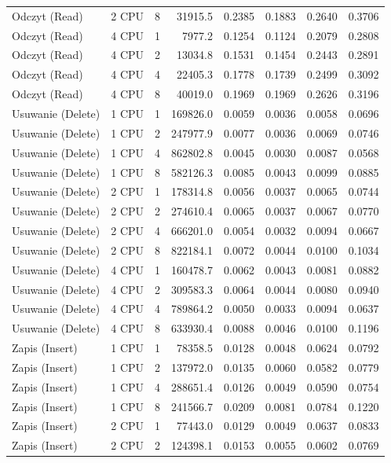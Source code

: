 \begin{table}[ht]
{\begin{tabular}{llcrrrrr}
Odczyt (Read) & 2 CPU & 8 & 31915.5 & 0.2385 & 0.1883 & 0.2640 & 0.3706 \\
Odczyt (Read) & 4 CPU & 1 & 7977.2 & 0.1254 & 0.1124 & 0.2079 & 0.2808 \\
Odczyt (Read) & 4 CPU & 2 & 13034.8 & 0.1531 & 0.1454 & 0.2443 & 0.2891 \\
Odczyt (Read) & 4 CPU & 4 & 22405.3 & 0.1778 & 0.1739 & 0.2499 & 0.3092 \\
Odczyt (Read) & 4 CPU & 8 & 40019.0 & 0.1969 & 0.1969 & 0.2626 & 0.3196 \\
Usuwanie (Delete) & 1 CPU & 1 & 169826.0 & 0.0059 & 0.0036 & 0.0058 & 0.0696 \\
Usuwanie (Delete) & 1 CPU & 2 & 247977.9 & 0.0077 & 0.0036 & 0.0069 & 0.0746 \\
Usuwanie (Delete) & 1 CPU & 4 & 862802.8 & 0.0045 & 0.0030 & 0.0087 & 0.0568 \\
Usuwanie (Delete) & 1 CPU & 8 & 582126.3 & 0.0085 & 0.0043 & 0.0099 & 0.0885 \\
Usuwanie (Delete) & 2 CPU & 1 & 178314.8 & 0.0056 & 0.0037 & 0.0065 & 0.0744 \\
Usuwanie (Delete) & 2 CPU & 2 & 274610.4 & 0.0065 & 0.0037 & 0.0067 & 0.0770 \\
Usuwanie (Delete) & 2 CPU & 4 & 666201.0 & 0.0054 & 0.0032 & 0.0094 & 0.0667 \\
Usuwanie (Delete) & 2 CPU & 8 & 822184.1 & 0.0072 & 0.0044 & 0.0100 & 0.1034 \\
Usuwanie (Delete) & 4 CPU & 1 & 160478.7 & 0.0062 & 0.0043 & 0.0081 & 0.0882 \\
Usuwanie (Delete) & 4 CPU & 2 & 309583.3 & 0.0064 & 0.0044 & 0.0080 & 0.0940 \\
Usuwanie (Delete) & 4 CPU & 4 & 789864.2 & 0.0050 & 0.0033 & 0.0094 & 0.0637 \\
Usuwanie (Delete) & 4 CPU & 8 & 633930.4 & 0.0088 & 0.0046 & 0.0100 & 0.1196 \\
Zapis (Insert) & 1 CPU & 1 & 78358.5 & 0.0128 & 0.0048 & 0.0624 & 0.0792 \\
Zapis (Insert) & 1 CPU & 2 & 137972.0 & 0.0135 & 0.0060 & 0.0582 & 0.0779 \\
Zapis (Insert) & 1 CPU & 4 & 288651.4 & 0.0126 & 0.0049 & 0.0590 & 0.0754 \\
Zapis (Insert) & 1 CPU & 8 & 241566.7 & 0.0209 & 0.0081 & 0.0784 & 0.1220 \\
Zapis (Insert) & 2 CPU & 1 & 77443.0 & 0.0129 & 0.0049 & 0.0637 & 0.0833 \\
Zapis (Insert) & 2 CPU & 2 & 124398.1 & 0.0153 & 0.0055 & 0.0602 & 0.0769 \\

\end{tabular}}
\end{table}
